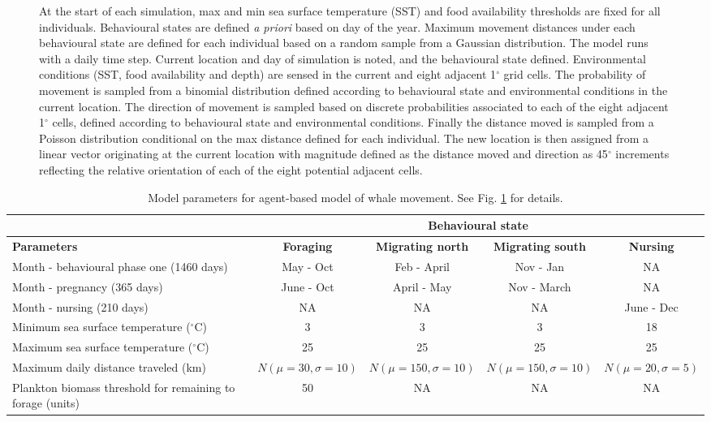 \documentclass[a4paper,12pt]{article}
\begin{document}
\begin{landscape}
\begin{figure}[!htbp]
{  At the start of each simulation, max and min sea surface temperature (SST) and food availability thresholds are fixed for all individuals. Behavioural states are defined \textit{a priori} based on day of the year. Maximum movement distances under each behavioural state are defined for each individual based on a random sample from a Gaussian distribution. The model runs with a daily time step. Current location and day of simulation is noted, and the behavioural state defined. Environmental conditions (SST, food availability and depth) are sensed in the current and eight adjacent 1$^{\circ}$ grid cells. The probability of movement is sampled from a binomial distribution defined according to behavioural state and environmental conditions in the current location. The direction of movement is sampled based on discrete probabilities associated to each of the eight adjacent 1$^{\circ}$ cells, defined according to behavioural state and environmental conditions. Finally the distance moved is sampled from a Poisson distribution conditional on the max distance defined for each individual. The new location is then assigned from a linear vector originating at the current location with magnitude defined as the distance moved and direction as 45$^{\circ}$ increments reflecting the relative orientation of each of the eight potential adjacent cells.}
  \label{figs5}
\end{figure}

\newpage

\centering
\begin{table}
  \begin{tabular}{|p{5cm}|c|c|c|c|} 
    \hline
    & \multicolumn{4}{|c|}{\textbf{Behavioural state}} \\
    \hline
    \textbf{Parameters} & \textbf{Foraging} & \textbf{Migrating north} & \textbf{Migrating south} & \textbf{Nursing}\\
    \hline
    Month - behavioural phase one (1460 days) & May - Oct & Feb - April & Nov - Jan & NA\\
    \hline
    Month - pregnancy (365 days) & June - Oct & April - May & Nov - March & NA\\
    \hline
    Month - nursing (210 days) & NA & NA & NA & June - Dec\\
    \hline
    Minimum sea surface temperature ($^{\circ}$C) & 3 & 3 & 3 & 18\\
    \hline
    Maximum sea surface temperature ($^{\circ}$C) & 25 & 25 & 25 & 25\\
    \hline
    Maximum daily distance traveled (km) & $N(\mu=30, \sigma=10)$ & $N(\mu=150, \sigma=10)$ & $N(\mu=150, \sigma=10)$ & $N(\mu=20, \sigma=5)$\\
    \hline
    Plankton biomass threshold for remaining to forage (units) & 50 & NA & NA & NA\\
    \hline
  \end{tabular}
  \caption{Model parameters for agent-based model of whale movement. See Fig. \ref{figs5} for details.}
  \label{tables1}
\end{table}

\end{landscape}
 
\newpage


\end{document}
